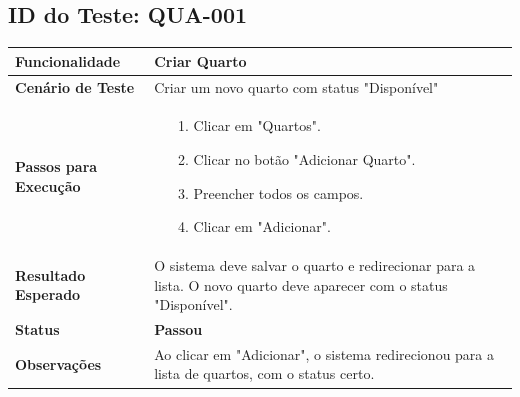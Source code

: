 \documentclass[
	12pt,				%
	openany,			%
	oneside,			%
	a4paper,			%
	english,			%
	french,				%
	spanish,			%
	brazil				%
	]{abntex2}
\begin{document}
\begin{apendicesenv}
\subsection*{ID do Teste: QUA-001}
\begin{tabular}{@{} p{5cm} p{11cm} @{}}
	\toprule
	\textbf{Funcionalidade} & Criar Quarto \\
	\midrule
	\textbf{Cenário de Teste} & Criar um novo quarto com status "Disponível" \\
	\midrule
	\textbf{Passos para Execução} & 
	\begin{itemize} \itemsep0em 
		\item[1.] Clicar em "Quartos".
		\item[2.] Clicar no botão "Adicionar Quarto".
		\item[3.] Preencher todos os campos.
		\item[4.] Clicar em "Adicionar".
	\end{itemize} \\
	\midrule
	\textbf{Resultado Esperado} & O sistema deve salvar o quarto e redirecionar para a lista. O novo quarto deve aparecer com o status "Disponível". \\
	\midrule
	\textbf{Status} & \textbf{Passou} \\
	\midrule
	\textbf{Observações} & Ao clicar em "Adicionar", o sistema redirecionou para a lista de quartos, com o status certo. \\
\end{tabular}
\vspace{1cm}


\end{apendicesenv}
\end{document}
